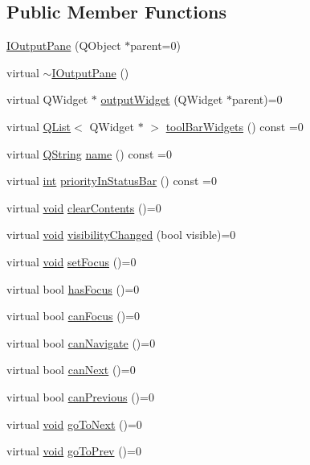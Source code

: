 \subsection*{Public Member Functions}
\begin{DoxyCompactItemize}
\item 
\hyperlink{group___core_plugin_ga47a14795596f88e7b26b737cb94e4348}{I\-Output\-Pane} (Q\-Object $\ast$parent=0)
\item 
virtual \hyperlink{group___core_plugin_ga74f2026df82773bb5ed94226666b641e}{$\sim$\-I\-Output\-Pane} ()
\item 
virtual Q\-Widget $\ast$ \hyperlink{group___core_plugin_ga99cb40dfe9b8625932283775e1edb2ba}{output\-Widget} (Q\-Widget $\ast$parent)=0
\item 
virtual \hyperlink{class_q_list}{Q\-List}$<$ Q\-Widget $\ast$ $>$ \hyperlink{group___core_plugin_ga6086193af6e059b86451cd5a3c0d2373}{tool\-Bar\-Widgets} () const =0
\item 
virtual \hyperlink{group___u_a_v_objects_plugin_gab9d252f49c333c94a72f97ce3105a32d}{Q\-String} \hyperlink{group___core_plugin_ga1504ed1816cbdb3458ff3439f6355d49}{name} () const =0
\item 
virtual \hyperlink{ioapi_8h_a787fa3cf048117ba7123753c1e74fcd6}{int} \hyperlink{group___core_plugin_ga46b89bfb71ca90a47531ec5536d50075}{priority\-In\-Status\-Bar} () const =0
\item 
virtual \hyperlink{group___u_a_v_objects_plugin_ga444cf2ff3f0ecbe028adce838d373f5c}{void} \hyperlink{group___core_plugin_ga0450bf70f518ec784c29d9d4f7a1ed3b}{clear\-Contents} ()=0
\item 
virtual \hyperlink{group___u_a_v_objects_plugin_ga444cf2ff3f0ecbe028adce838d373f5c}{void} \hyperlink{group___core_plugin_ga3128a309873592d64cddf36d88f76856}{visibility\-Changed} (bool visible)=0
\item 
virtual \hyperlink{group___u_a_v_objects_plugin_ga444cf2ff3f0ecbe028adce838d373f5c}{void} \hyperlink{group___core_plugin_ga3f018a7b33734836caaf6d26346d2847}{set\-Focus} ()=0
\item 
virtual bool \hyperlink{group___core_plugin_ga53b719828a92b5466b432ee47cf9961e}{has\-Focus} ()=0
\item 
virtual bool \hyperlink{group___core_plugin_ga181d2716dd1a399a31c2db4e4c57f2cb}{can\-Focus} ()=0
\item 
virtual bool \hyperlink{group___core_plugin_ga955964e740f01e5750466e0d9a94b6a8}{can\-Navigate} ()=0
\item 
virtual bool \hyperlink{group___core_plugin_gaf443b3346efc59338b4a21e97b800111}{can\-Next} ()=0
\item 
virtual bool \hyperlink{group___core_plugin_gab8f58bb62f6ebcb98768447471cfe21c}{can\-Previous} ()=0
\item 
virtual \hyperlink{group___u_a_v_objects_plugin_ga444cf2ff3f0ecbe028adce838d373f5c}{void} \hyperlink{group___core_plugin_ga2ddbd6616a138d34c937f59ece4c3118}{go\-To\-Next} ()=0
\item 
virtual \hyperlink{group___u_a_v_objects_plugin_ga444cf2ff3f0ecbe028adce838d373f5c}{void} \hyperlink{group___core_plugin_ga292b3bbe41d455040928fab85b78c79d}{go\-To\-Prev} ()=0
\end{DoxyCompactItemize}


